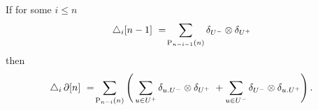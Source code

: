 
\begin{lemma} \label{lemma: boundary of triangle}
	If for some $i \leq n$
	\[
	\triangle_i [n-1]\ =\!
	\sum_{\mathrm{P}_{n-i-1}(n)} \delta_{U^-} \otimes \delta_{U^+}
	\]
	then
	\begin{align}
	\label{equation: triangle of boundary}
	\triangle_i \operatorname{\partial} [n] \ =\! \sum_{\mathrm{P}_{n-i}(n)} \left( \,
	\sum_{u \in U^+} \delta_{u.U^-} \otimes \delta_{U^+} \ +
	\sum_{u \in U^-} \delta_{U^-} \otimes \delta_{u.U^+} \right).
	\end{align}
\end{lemma}

